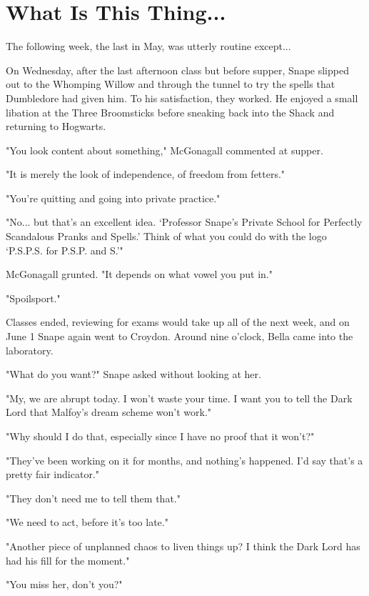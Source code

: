 
\chapter{What Is This Thing...}

The following week, the last in May, was utterly routine except...

On Wednesday, after the last afternoon class but before supper, Snape slipped out to the Whomping Willow and through the tunnel to try the spells that Dumbledore had given him. To his satisfaction, they worked. He enjoyed a small libation at the Three Broomsticks before sneaking back into the Shack and returning to Hogwarts.

"You look content about something," McGonagall commented at supper.

"It is merely the look of independence, of freedom from fetters."

"You're quitting and going into private practice."

"No... but that's an excellent idea. `Professor Snape's Private School for Perfectly Scandalous Pranks and Spells.' Think of what you could do with the logo `P.S.P.S. for P.S.P. and S.'"

McGonagall grunted. "It depends on what vowel you put in."

"Spoilsport."

Classes ended, reviewing for exams would take up all of the next week, and on June 1 Snape again went to Croydon. Around nine o'clock, Bella came into the laboratory.

"What do you want?" Snape asked without looking at her.

"My, we are abrupt today. I won't waste your time. I want you to tell the Dark Lord that Malfoy's dream scheme won't work."

"Why should I do that, especially since I have no proof that it won't?"

"They've been working on it for months, and nothing's happened. I'd say that's a pretty fair indicator."

"They don't need me to tell them that."

"We need to act, before it's too late."

"Another piece of unplanned chaos to liven things up? I think the Dark Lord has had his fill for the moment."

"You miss her, don't you?"

